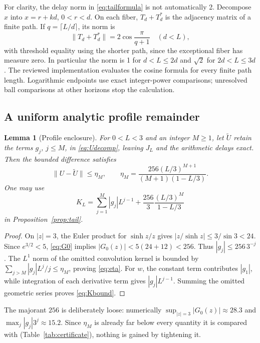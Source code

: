 \documentclass[11pt]{article}
\numberwithin{equation}{section}
\newtheorem{lemma}[theorem]{Lemma}
\theoremstyle{definition}
\theoremstyle{remark}
\newcommand{\norm}[1]{\lVert#1\rVert}
\begin{document}
For clarity, the delay norm in \eqref{eq:tailformula} is not automatically 2.
Decompose $x$ into $x=r+kd$, $0<r<d$. On each fiber,
$T_d+T_d^*$ is the adjacency matrix of a finite path. If
$q=\lceil L/d\rceil$, its norm is
\begin{equation}\label{eq:chainnorm}
 \norm{T_d+T_d^*}=2\cos\frac{\pi}{q+1}
 \quad(d<L),
\end{equation}
with threshold equality using the shorter path, since the exceptional fiber
has measure zero. In particular the norm is 1 for $d<L\le2d$ and
$\sqrt2$ for $2d<L\le3d$. The reviewed implementation evaluates the
cosine formula for every finite path length. Logarithmic endpoints use
exact integer-power comparisons; unresolved ball comparisons at other
horizons stop the calculation.

\subsection{A uniform analytic profile remainder}

\begin{lemma}[Profile enclosure]\label{lem:profile}
For $0<L<3$ and an integer $M\ge1$, let $\widetilde U$ retain the terms
$g_j$, $j\le M$, in \eqref{eq:Udecomp}, leaving $J_L$ and the arithmetic
delays exact. Then the bounded difference satisfies
\begin{equation}\label{eq:eta}
 \norm{U-\widetilde U}\le\eta_M,
 \qquad \eta_M=\frac{256(L/3)^{M+1}}{(M+1)(1-L/3)}.
\end{equation}
One may use
\begin{equation}\label{eq:Kbound}
 K_L=\sum_{j=1}^M|g_j|L^{j-1}
 +\frac{256}{3}\frac{(L/3)^M}{1-L/3}
\end{equation}
in Proposition~\ref{prop:tail}.
\end{lemma}
\begin{proof}
On $|z|=3$, the Euler product for $\sinh z/z$
\cite[\S4.36]{DLMF} gives $|z/\sinh z|\le3/\sin3<24$.
Since $e^{3/2}<5$, \eqref{eq:G0} implies
$|G_0(z)|<5(24+12)<256$. Thus $|g_j|\le256\,3^{-j}$.
The $L^1$ norm of the omitted convolution kernel is bounded by
$\sum_{j>M}|g_j|L^j/j\le\eta_M$, proving \eqref{eq:eta}.
For $w$, the constant term contributes $|g_1|$, while integration of each
derivative term gives $|g_j|L^{j-1}$. Summing the omitted geometric series
proves \eqref{eq:Kbound}.
\end{proof}

The majorant $256$ is deliberately loose: numerically
$\sup_{|z|=3}|G_0(z)|\approx28.3$ and $\max_j|g_j|3^j\approx15.2$. Since
$\eta_M$ is already far below every quantity it is compared with
(Table~\ref{tab:certificate}), nothing is gained by tightening it.
\end{document}
